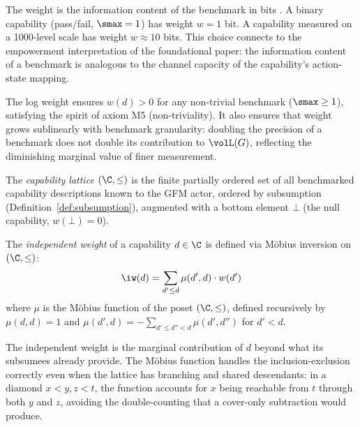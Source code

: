 The weight is the information content of the benchmark in bits
\citep{cover2006elements}. A binary
capability (pass/fail, $\smax = 1$) has weight $w = 1$ bit. A capability
measured on a 1000-level scale has weight $w \approx 10$ bits. This choice
connects to the empowerment interpretation of the foundational paper: the
information content of a benchmark is analogous to the channel capacity of the
capability's action-state mapping.

The log weight ensures $w(d) > 0$ for any non-trivial benchmark ($\smax \geq
1$), satisfying the spirit of axiom M5 (non-triviality). It also ensures that
weight grows sublinearly with benchmark granularity: doubling the precision of
a benchmark does not double its contribution to $\volL(G)$, reflecting the
diminishing marginal value of finer measurement.


\begin{definition}
\label{def:capability_lattice}
The \emph{capability lattice} $(\C, \leq)$ is the finite partially ordered
    set of all benchmarked capability descriptions known to the GFM actor,
    ordered by subsumption (Definition~\ref{def:subsumption}), augmented with
    a bottom element $\bot$ (the null capability, $w(\bot) = 0$).
\end{definition}

\begin{definition}
\label{def:independent_weight}
The \emph{independent weight} of a capability $d \in \C$ is defined via
    M\"{o}bius inversion \citep{rota1964foundations} on $(\C, \leq)$:
\begin{equation}
\label{eq:independent_weight}
\iw(d) = \sum_{d' \leq d} \mu(d', d) \cdot w(d')
\end{equation}
where $\mu$ is the M\"{o}bius function of the poset $(\C, \leq)$, defined
    recursively by $\mu(d, d) = 1$ and
    $\mu(d', d) = -\sum_{d' \leq d'' < d} \mu(d', d'')$ for $d' < d$.
\end{definition}

The independent weight is the marginal contribution of $d$ beyond what its
subsumees already provide. The M\"{o}bius function handles the
inclusion-exclusion correctly even when the lattice has branching and shared
descendants: in a diamond $x < y, z < t$, the function accounts for $x$ being
reachable from $t$ through both $y$ and $z$, avoiding the double-counting that
a cover-only subtraction would produce.

